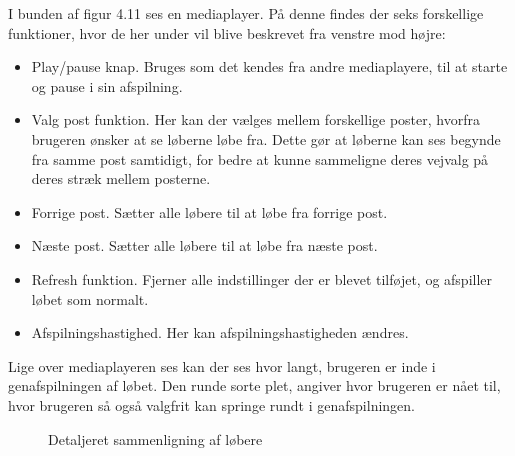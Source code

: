 I bunden af figur 4.11 ses en mediaplayer. På denne findes der seks forskellige funktioner, hvor de her under vil blive beskrevet fra venstre mod højre: 
\begin{itemize}
\item Play/pause knap. Bruges som det kendes fra andre mediaplayere, til at starte og pause i sin afspilning.
\item Valg post funktion. Her kan der vælges mellem forskellige poster, hvorfra brugeren ønsker at se løberne løbe fra. Dette gør at løberne kan ses begynde fra samme post samtidigt, for bedre at kunne sammeligne deres vejvalg på deres stræk mellem posterne.
\item Forrige post. Sætter alle løbere til at løbe fra forrige post.
\item Næste post. Sætter alle løbere til at løbe fra næste post.
\item Refresh funktion. Fjerner alle indstillinger der er blevet tilføjet, og afspiller løbet som normalt.
\item Afspilningshastighed. Her kan afspilningshastigheden ændres.
\end{itemize}
Lige over mediaplayeren ses kan der ses hvor langt, brugeren er inde i genafspilningen af løbet. Den runde sorte plet, angiver hvor brugeren er nået til, hvor brugeren så også valgfrit kan springe rundt i genafspilningen.

\begin{figure}[h]
    \centering
    \caption{Detaljeret sammenligning af løbere}
\end{figure}

